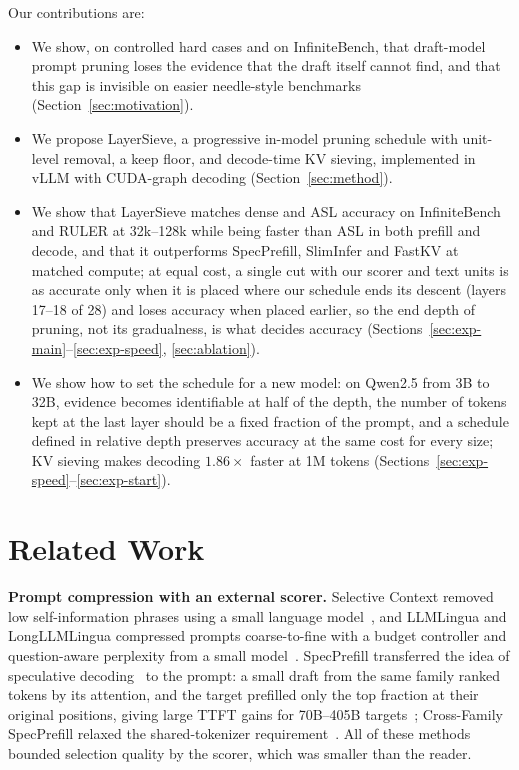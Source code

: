 \documentclass[10pt,conference]{IEEEtran}
\begin{document}
Our contributions are:
\begin{itemize}
  \item We show, on controlled hard cases and on InfiniteBench, that draft-model prompt pruning loses the evidence that the draft itself cannot find, and that this gap is invisible on easier needle-style benchmarks (Section~\ref{sec:motivation}).
  \item We propose LayerSieve, a progressive in-model pruning schedule with unit-level removal, a keep floor, and decode-time KV sieving, implemented in vLLM with CUDA-graph decoding (Section~\ref{sec:method}).
  \item We show that LayerSieve matches dense and ASL accuracy on InfiniteBench and RULER at 32k--128k while being faster than ASL in both prefill and decode, and that it outperforms SpecPrefill, SlimInfer and FastKV at matched compute; at equal cost, a single cut with our scorer and text units is as accurate only when it is placed where our schedule ends its descent (layers 17--18 of 28) and loses accuracy when placed earlier, so the end depth of pruning, not its gradualness, is what decides accuracy (Sections~\ref{sec:exp-main}--\ref{sec:exp-speed}, \ref{sec:ablation}).
  \item We show how to set the schedule for a new model: on Qwen2.5 from 3B to 32B, evidence becomes identifiable at half of the depth, the number of tokens kept at the last layer should be a fixed fraction of the prompt, and a schedule defined in relative depth preserves accuracy at the same cost for every size; KV sieving makes decoding $1.86\times$ faster at 1M tokens (Sections~\ref{sec:exp-speed}--\ref{sec:exp-start}).
\end{itemize}

\section{Related Work}
\label{sec:related}

\textbf{Prompt compression with an external scorer.}
Selective Context removed low self-information phrases using a small language model~\cite{li2023selective}, and LLMLingua and LongLLMLingua compressed prompts coarse-to-fine with a budget controller and question-aware perplexity from a small model~\cite{jiang2023llmlingua,jiang2024longllmlingua}. SpecPrefill transferred the idea of speculative decoding~\cite{leviathan2023speculative} to the prompt: a small draft from the same family ranked tokens by its attention, and the target prefilled only the top fraction at their original positions, giving large TTFT gains for 70B--405B targets~\cite{liu2025specprefill}; Cross-Family SpecPrefill relaxed the shared-tokenizer requirement~\cite{upasani2026crossfamily}. All of these methods bounded selection quality by the scorer, which was smaller than the reader.
\end{document}
